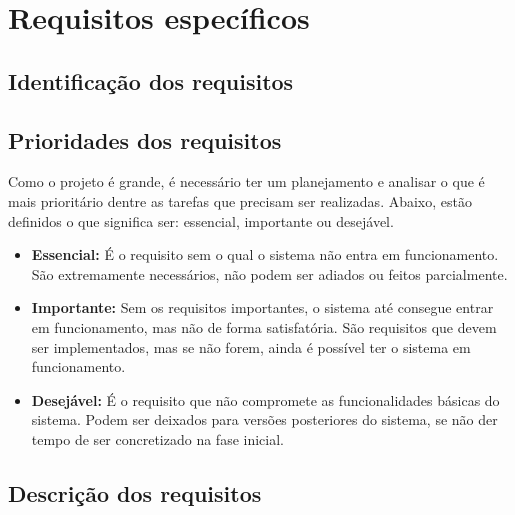 \documentclass[12pt,a4paper]{report}
\begin{document}
\section{Requisitos específicos}


\subsection{Identificação dos requisitos}

\subsection{Prioridades dos requisitos}

Como o projeto é grande, é necessário ter um planejamento e analisar o que é mais prioritário dentre as tarefas que precisam ser realizadas. Abaixo, estão definidos o que significa ser: essencial, importante ou desejável. \\

\begin{itemize}
\item \textbf{Essencial:}
É o requisito sem o qual o sistema não entra em funcionamento.
São extremamente necessários, não podem ser adiados ou feitos parcialmente.

\item \textbf{Importante:}
Sem os requisitos importantes, o sistema até consegue entrar em funcionamento, mas não de forma satisfatória. São requisitos que devem ser implementados, mas se não forem, ainda é possível ter o sistema em funcionamento.


\item \textbf{Desejável:}
É o requisito que não compromete as funcionalidades básicas do sistema. 
Podem ser deixados para versões posteriores do sistema, se não der tempo de ser concretizado na fase inicial.


\end{itemize}


\subsection{Descrição dos requisitos}
\end{document}
